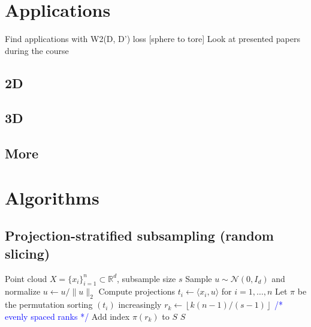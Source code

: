 \documentclass{article} %
\newcommand{\R}{\mathbb{R}}
\theoremstyle{plain}
\theoremstyle{definition}
\theoremstyle{remark}
\newcommand{\cmt}[1]{\textcolor{blue}{\footnotesize\ttfamily /* #1 */}}
\begin{document}
\section{Applications}
Find applications with W2(D, D') loss [sphere to tore]
Look at presented papers during the course
\subsection{2D}
\subsection{3D}
\subsection{More}
\fi











\newpage


\clearpage

\appendix
\section{Algorithms}\label{app:algo}

\subsection{Projection-stratified subsampling (random slicing)}
\label{app:random_slicing}

\begin{algorithm}[H]
\caption{Projection-stratified subsampling (random slicing)}
\label{alg:random_slicing}
\begin{algorithmic}[1]
\Require Point cloud $X=\{x_i\}_{i=1}^n\subset\R^d$, subsample size $s$
\State Sample $u\sim\mathcal{N}(0,I_d)$ and normalize $u\leftarrow u/\|u\|_2$
\State Compute projections $t_i\leftarrow \langle x_i,u\rangle$ for $i=1,\dots,n$ 
\State Let $\pi$ be the permutation sorting $(t_i)$ increasingly 
  \State $r_k \leftarrow \left\lfloor k(n-1)/(s-1)\right\rfloor$  \quad \cmt{evenly spaced ranks}
  \State Add index $\pi(r_k)$ to $S$
\EndFor
\State \Return $S$
\end{algorithmic}
\end{algorithm}
\end{document}
